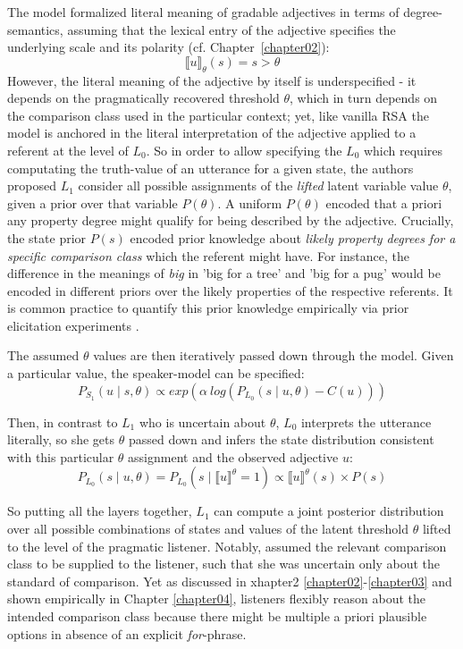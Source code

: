 The model formalized literal meaning of gradable adjectives in terms of degree-semantics, assuming that the lexical entry of the adjective specifies the underlying scale and its polarity (cf. Chapter~\ref{chapter02}):
\begin{equation}
\llbracket u \rrbracket_{\theta} (s) = s > \theta
\end{equation}
However, the literal meaning of the adjective by itself is underspecified - it depends on the pragmatically recovered threshold $\theta$, which in turn depends on the comparison class used in the particular context; yet, like vanilla RSA the model is anchored in the literal interpretation of the adjective applied to a referent at the level of $L_0$.  
So in order to allow specifying the $L_0$ which requires computating the truth-value of an utterance for a given state, the authors proposed $L_1$ consider all possible assignments of the \emph{lifted} latent variable value $\theta$, given a prior over that variable $P(\theta)$. A uniform $P(\theta)$ encoded that a priori any property degree might qualify for being described by the adjective. Crucially, the state prior $P(s)$ encoded prior knowledge about \emph{likely property degrees for a specific comparison class} which the referent might have. For instance, the difference in the meanings of \emph{big} in 'big for a tree' and 'big for a pug' would be encoded in different priors over the likely properties of the respective referents. It is common practice to quantify this prior knowledge empirically via prior elicitation experiments \parencite{problang}.

The assumed $\theta$ values are then iteratively passed down through the model. Given a particular value, the speaker-model can be specified:
\begin{equation}
	P_{S_1} (u \mid s, \theta) \propto exp(\alpha \: log (P_{L_0} (s \mid u, \theta) - C(u)) )
\end{equation}	

Then, in contrast to $L_1$ who is uncertain about $\theta$, $L_0$ interprets the utterance literally, so she gets $\theta$ passed down and infers the state distribution consistent with this particular $\theta$ assignment and the observed adjective $u$:
\begin{equation}
P_{L_0} (s \mid u, \theta) = P_{L_0} (s \mid \llbracket u \rrbracket ^\theta = 1 ) \propto \llbracket u \rrbracket ^\theta (s) \times P(s)
\end{equation}

So putting all the layers together, $L_1$ can compute a joint posterior distribution over all possible combinations of states and values of the latent threshold $\theta$ lifted to the level of the pragmatic listener. Notably, \textcite{lassiter2013context} assumed the relevant comparison class to be supplied to the listener, such that she was uncertain only about the standard of comparison. Yet as discussed in xhapter2 \ref{chapter02}-\ref{chapter03} and shown empirically in Chapter \ref{chapter04}, listeners flexibly reason about the intended comparison class because there might be multiple a priori plausible options in absence of an explicit \emph{for}-phrase.

